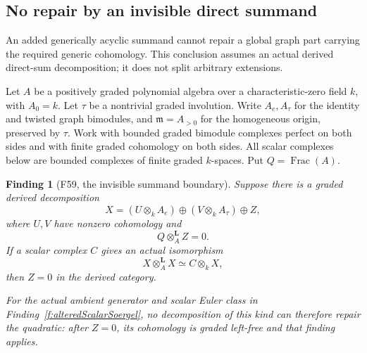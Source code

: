 \documentclass[11pt,a4paper]{article}
\newcommand{\fid}[1]{\textsf{#1}}\newcommand{\gate}[1]{\textsf{#1}}
\theoremstyle{named}\newtheorem{finding}{Finding}[section]
\theoremstyle{definition}\newtheorem{definition}[finding]{Definition}
\theoremstyle{remark}\newtheorem{remark}[finding]{Remark}
\begin{document}
\subsection{No repair by an invisible direct summand}

An added generically acyclic summand cannot repair a
global graph part carrying the required generic
cohomology. This conclusion assumes an actual derived
direct-sum decomposition; it does not split arbitrary
extensions.

Let \(A\) be a positively graded polynomial algebra
over a characteristic-zero field \(k\), with \(A_0=k\).
Let \(\tau\) be a nontrivial graded involution.
Write \(A_e,A_\tau\) for the identity and twisted
graph bimodules, and \(\mathfrak m=A_{>0}\) for the
homogeneous origin, preserved by \(\tau\).
Work with bounded graded bimodule complexes perfect
on both sides and with finite graded cohomology on
both sides. All scalar complexes below are bounded
complexes of finite graded \(k\)-spaces.
Put \(Q=\operatorname{Frac}(A)\).

\begin{finding}[\fid{F59}, the invisible summand boundary]
\label{f:invisibleSummandNoGo}
Suppose there is a graded derived decomposition
\begin{equation}\label{eq:invisibleSummandDecomposition}
 X=(U\otimes_kA_e)\oplus(V\otimes_kA_\tau)\oplus Z,
\end{equation}
where \(U,V\) have nonzero cohomology and
\[
                         Q\otimes_A^{\mathbf L}Z=0.
\]
If a scalar complex \(C\) gives an actual isomorphism
\begin{equation}\label{eq:invisibleSummandQuadratic}
 X\otimes_A^{\mathbf L}X\simeq C\otimes_kX,
\end{equation}
then \(Z=0\) in the derived category.

For the actual ambient generator and scalar Euler
class in Finding~\ref{f:alteredScalarSoergel}, no
decomposition of this kind can therefore repair the
quadratic: after \(Z=0\), its cohomology is graded
left-free and that finding applies.
\end{finding}
\end{document}
